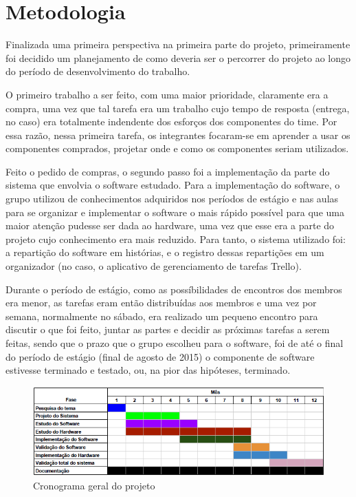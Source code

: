 \chapter{Metodologia}
\label{Métodos de implementação}

Finalizada uma primeira perspectiva na primeira parte do projeto, primeiramente foi decidido um planejamento de como deveria ser o percorrer do projeto ao longo do período de desenvolvimento do trabalho.

O primeiro trabalho a ser feito, com uma maior prioridade, claramente era a compra, uma vez que tal tarefa era um trabalho cujo tempo de resposta (entrega, no caso) era totalmente indendente dos esforços dos componentes do time. Por essa razão, nessa primeira tarefa, os integrantes focaram-se em aprender a usar os componentes comprados, projetar onde e como os componentes seriam utilizados.

Feito o pedido de compras, o segundo passo foi a implementação da parte do sistema que envolvia o software estudado. Para a implementação do software, o grupo utilizou de conhecimentos adquiridos nos períodos de estágio e nas aulas para se organizar e implementar o software o mais rápido possível para que uma maior atenção pudesse ser dada ao hardware, uma vez que esse era a parte do projeto cujo conhecimento era mais reduzido. Para tanto, o sistema utilizado foi: a repartição do software em histórias, e o registro dessas repartições em um organizador (no caso, o aplicativo de gerenciamento de tarefas Trello). 

Durante o período de estágio, como as possíbilidades de encontros dos membros era menor, as tarefas eram então distribuídas aos membros e uma vez por semana, normalmente no sábado, era realizado um pequeno encontro para discutir o que foi feito, juntar as partes e decidir as próximas tarefas a serem feitas, sendo que o prazo que o grupo escolheu para o software, foi de até o final do período de estágio (final de agosto de 2015) o componente de software estivesse terminado e testado, ou, na pior das hipóteses, terminado.

\begin{figure}
\centering
\includegraphics[width=1\textwidth]{figuras/cronogram.png}
\caption{\label{fig:cronogram} Cronograma geral do projeto}
\end{figure}